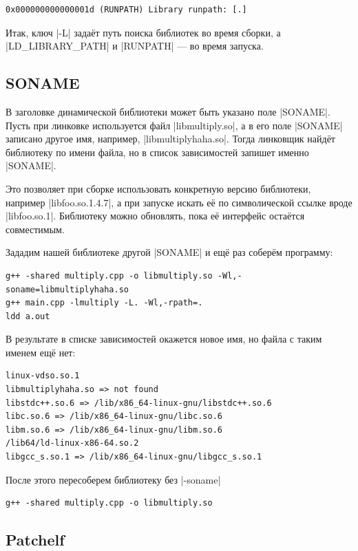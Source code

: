 \documentclass[11pt]{article}
\begin{document}
\begin{lstlisting}
0x000000000000001d (RUNPATH) Library runpath: [.]
\end{lstlisting}

Итак, ключ \nolint|-L| задаёт путь поиска библиотек во время сборки, а \nolint|LD_LIBRARY_PATH| и
\nolint|RUNPATH| --- во время запуска.

\subsection{SONAME}

В заголовке динамической библиотеки может быть указано поле \nolint|SONAME|.
Пусть при линковке используется файл \nolint|libmultiply.so|, а в его поле
\nolint|SONAME| записано другое имя, например, \nolint|libmultiplyhaha.so|. Тогда линковщик найдёт библиотеку по имени файла, но в список зависимостей
запишет именно \nolint|SONAME|.

Это позволяет при сборке использовать конкретную версию библиотеки, например
\nolint|libfoo.so.1.4.7|, а при запуске искать её по символической ссылке вроде
\nolint|libfoo.so.1|. Библиотеку можно обновлять, пока её интерфейс остаётся совместимым.
\newpage

Зададим нашей библиотеке другой \nolint|SONAME| и ещё раз соберём программу:

\begin{lstlisting}
g++ -shared multiply.cpp -o libmultiply.so -Wl,-soname=libmultiplyhaha.so
g++ main.cpp -lmultiply -L. -Wl,-rpath=.
ldd a.out
\end{lstlisting}

В результате в списке зависимостей окажется новое имя, но файла с таким именем ещё нет:

\begin{lstlisting}
linux-vdso.so.1
libmultiplyhaha.so => not found
libstdc++.so.6 => /lib/x86_64-linux-gnu/libstdc++.so.6
libc.so.6 => /lib/x86_64-linux-gnu/libc.so.6
libm.so.6 => /lib/x86_64-linux-gnu/libm.so.6
/lib64/ld-linux-x86-64.so.2
libgcc_s.so.1 => /lib/x86_64-linux-gnu/libgcc_s.so.1
\end{lstlisting}
После этого пересоберем библиотеку без \nolint|-soname|
\begin{lstlisting}
g++ -shared multiply.cpp -o libmultiply.so
\end{lstlisting}

\subsection{Patchelf}
\end{document}
